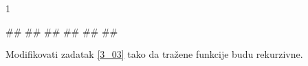 \begin{Exercise}[label=3_03]
\begin{miditest}
\begin{test2}{1}
  
#\naslovInt#
##
##
##
## 
##
\end{test2}
\end{miditest}


\end{Exercise}

\begin{Answer}[ref=3_03]
\end{Answer}
\begin{Exercise}[label=3_04]
  Modifikovati zadatak \ref{3_03} tako da tražene funkcije
  budu rekurzivne.


\end{Exercise}

